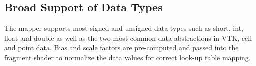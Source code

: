
\subsection{Broad Support of Data Types}
The mapper supports most signed and unsigned data types such as short, int,
float and double as well as the two most common data abstractions in VTK,
cell and point data.  Bias and scale factors are pre-computed and passed into
the fragment shader to normalize the data values for correct look-up table
mapping.

